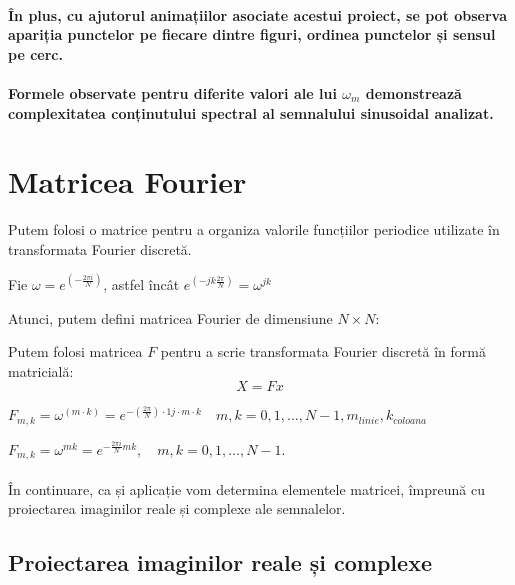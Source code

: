 \documentclass{article}
\begin{document}
\paragraph{În plus, cu ajutorul animațiilor asociate acestui proiect, se pot observa apariția punctelor pe fiecare dintre figuri, ordinea punctelor și sensul pe cerc.}

\paragraph{Formele observate pentru diferite valori ale lui \(\omega_m\) demonstrează complexitatea conținutului spectral al semnalului sinusoidal analizat.}

\section*{Matricea Fourier}

Putem folosi o matrice pentru a organiza valorile funcțiilor periodice utilizate în transformata Fourier discretă.

Fie \(\omega = e^{ \left(-\frac{2\pi i}{N}\right)}\), astfel încât
\(e^{\left(-jk\frac{2\pi}{N}\right)} = \omega^{jk}\)


Atunci, putem defini matricea Fourier de dimensiune \(N \times N\):


Putem folosi matricea \(F\) pentru a scrie transformata Fourier discretă în formă matricială:
\[
X = Fx
\]


\( F_{m,k} = \omega^{(m \cdot k)} = e^{-(\frac{2 \pi}{N}) \cdot 1j \cdot m \cdot k} \quad m,k = 0, 1, \dots, N-1, m_{linie}, k_{coloana}\)

\(
F_{m,k} = \omega^{m k}
= e^{-\frac{2\pi i}{N} m k},
\quad m,k = 0, 1, \dots, N-1.
\)

\paragraph{} În continuare, ca și aplicație vom determina elementele matricei, împreună cu proiectarea imaginilor reale și complexe ale semnalelor.

\subsection*{ Proiectarea imaginilor reale și complexe }
\end{document}
